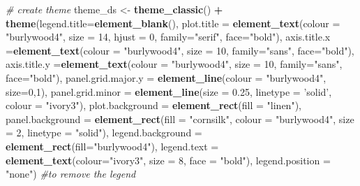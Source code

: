 \documentclass[
]{article}
\newenvironment{Shaded}{\begin{snugshade}}{\end{snugshade}}
\newcommand{\CommentTok}[1]{\textcolor[rgb]{0.56,0.35,0.01}{\textit{#1}}}
\newcommand{\DataTypeTok}[1]{\textcolor[rgb]{0.13,0.29,0.53}{#1}}
\newcommand{\DecValTok}[1]{\textcolor[rgb]{0.00,0.00,0.81}{#1}}
\newcommand{\FloatTok}[1]{\textcolor[rgb]{0.00,0.00,0.81}{#1}}
\newcommand{\KeywordTok}[1]{\textcolor[rgb]{0.13,0.29,0.53}{\textbf{#1}}}
\newcommand{\NormalTok}[1]{#1}
\newcommand{\OperatorTok}[1]{\textcolor[rgb]{0.81,0.36,0.00}{\textbf{#1}}}
\newcommand{\StringTok}[1]{\textcolor[rgb]{0.31,0.60,0.02}{#1}}
\begin{document}
\begin{Shaded}
\begin{Highlighting}[]
\CommentTok{# create theme}
\NormalTok{theme_ds <-}\StringTok{ }\KeywordTok{theme_classic}\NormalTok{() }\OperatorTok{+}
\StringTok{  }\KeywordTok{theme}\NormalTok{(}\DataTypeTok{legend.title=}\KeywordTok{element_blank}\NormalTok{(), }
        \DataTypeTok{plot.title =} \KeywordTok{element_text}\NormalTok{(}\DataTypeTok{colour =} \StringTok{"burlywood4"}\NormalTok{, }\DataTypeTok{size =} \DecValTok{14}\NormalTok{, }\DataTypeTok{hjust =} \DecValTok{0}\NormalTok{, }\DataTypeTok{family=}\StringTok{"serif"}\NormalTok{, }\DataTypeTok{face=}\StringTok{"bold"}\NormalTok{),}
        \DataTypeTok{axis.title.x =}\KeywordTok{element_text}\NormalTok{(}\DataTypeTok{colour =} \StringTok{"burlywood4"}\NormalTok{, }\DataTypeTok{size =} \DecValTok{10}\NormalTok{, }\DataTypeTok{family=}\StringTok{"sans"}\NormalTok{, }\DataTypeTok{face=}\StringTok{"bold"}\NormalTok{),}
        \DataTypeTok{axis.title.y =}\KeywordTok{element_text}\NormalTok{(}\DataTypeTok{colour =} \StringTok{"burlywood4"}\NormalTok{, }\DataTypeTok{size =} \DecValTok{10}\NormalTok{, }\DataTypeTok{family=}\StringTok{"sans"}\NormalTok{, }\DataTypeTok{face=}\StringTok{"bold"}\NormalTok{), }
        \DataTypeTok{panel.grid.major.y =} \KeywordTok{element_line}\NormalTok{(}\DataTypeTok{colour =} \StringTok{"burlywood4"}\NormalTok{, }\DataTypeTok{size=}\DecValTok{0}\NormalTok{,}\DecValTok{1}\NormalTok{),}
        \DataTypeTok{panel.grid.minor =} \KeywordTok{element_line}\NormalTok{(}\DataTypeTok{size =} \FloatTok{0.25}\NormalTok{, }\DataTypeTok{linetype =} \StringTok{'solid'}\NormalTok{, }\DataTypeTok{colour =} \StringTok{"ivory3"}\NormalTok{),}
        \DataTypeTok{plot.background =} \KeywordTok{element_rect}\NormalTok{(}\DataTypeTok{fill =} \StringTok{"linen"}\NormalTok{),}
        \DataTypeTok{panel.background =} \KeywordTok{element_rect}\NormalTok{(}\DataTypeTok{fill =} \StringTok{"cornsilk"}\NormalTok{, }\DataTypeTok{colour =} \StringTok{"burlywood4"}\NormalTok{,}
                                        \DataTypeTok{size =} \DecValTok{2}\NormalTok{, }\DataTypeTok{linetype =} \StringTok{"solid"}\NormalTok{),}
        \DataTypeTok{legend.background =} \KeywordTok{element_rect}\NormalTok{(}\DataTypeTok{fill=}\StringTok{"burlywood4"}\NormalTok{), }
        \DataTypeTok{legend.text =} \KeywordTok{element_text}\NormalTok{(}\DataTypeTok{colour=}\StringTok{"ivory3"}\NormalTok{, }\DataTypeTok{size =} \DecValTok{8}\NormalTok{, }\DataTypeTok{face =} \StringTok{"bold"}\NormalTok{),}
        \DataTypeTok{legend.position =} \StringTok{"none"}\NormalTok{) }\CommentTok{#to remove the legend}


\end{Highlighting}
\end{Shaded}
\end{document}
